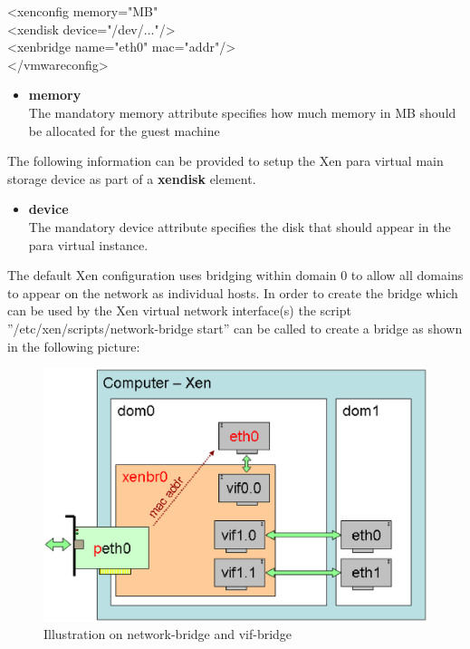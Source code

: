 \begin{itemize}
	\begin{Command}{12cm}
	<xenconfig memory="MB"\\
	\hspace*{1cm}<xendisk device="/dev/..."/>\\
	\hspace*{1cm}<xenbridge name="eth0" mac="addr"/>\\
	</vmwareconfig>
	\end{Command}

	\begin{itemize}
	\item \textbf{memory}\\
      The mandatory memory attribute specifies how much memory in MB
      should be allocated for the guest machine    
	\end{itemize}

	The following information can be provided to setup the Xen para virtual
	main storage device as part of a \textbf{xendisk} element.

	\begin{itemize}
	\item \textbf{device}\\
      The mandatory device attribute specifies the disk that should appear
      in the para virtual instance.
	\end{itemize}

	The default Xen configuration uses bridging within domain 0 to allow all
	domains to appear on the network as individual hosts. In order to create
	the bridge which can be used by the Xen virtual network interface(s) the
	script ''/etc/xen/scripts/network-bridge start'' can be called to create
	a bridge as shown in the following picture:

	\begin{figure}[h]
	\centering
	\includegraphics[scale=0.5]{pictures/xenbridge.eps}
	\caption{Illustration on network-bridge and vif-bridge}
	\label{fig:architecture}
	\end{figure}


\end{itemize}
